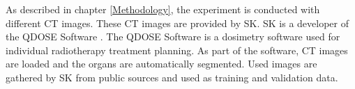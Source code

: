 As described in chapter \ref{Methodology}, the experiment is conducted with different CT images. These CT images are provided by \ac{SK}. \ac{SK} is a developer of the QDOSE Software \cite{.23Aug22}. The QDOSE Software is a dosimetry software used for individual
radiotherapy treatment planning. As part of the software, CT images are loaded and the organs are automatically segmented. Used images are gathered by \ac{SK} from public sources and used as training and validation data. 